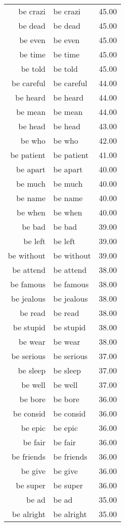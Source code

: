 \begin{table}[ht]
\begin{tabular}{rlr}
  be crazi & be crazi & 45.00 \\ 
  be dead & be dead & 45.00 \\ 
  be even & be even & 45.00 \\ 
  be time & be time & 45.00 \\ 
  be told & be told & 45.00 \\ 
  be careful & be careful & 44.00 \\ 
  be heard & be heard & 44.00 \\ 
  be mean & be mean & 44.00 \\ 
  be head & be head & 43.00 \\ 
  be who & be who & 42.00 \\ 
  be patient & be patient & 41.00 \\ 
  be apart & be apart & 40.00 \\ 
  be much & be much & 40.00 \\ 
  be name & be name & 40.00 \\ 
  be when & be when & 40.00 \\ 
  be bad & be bad & 39.00 \\ 
  be left & be left & 39.00 \\ 
  be without & be without & 39.00 \\ 
  be attend & be attend & 38.00 \\ 
  be famous & be famous & 38.00 \\ 
  be jealous & be jealous & 38.00 \\ 
  be read & be read & 38.00 \\ 
  be stupid & be stupid & 38.00 \\ 
  be wear & be wear & 38.00 \\ 
  be serious & be serious & 37.00 \\ 
  be sleep & be sleep & 37.00 \\ 
  be well & be well & 37.00 \\ 
  be bore & be bore & 36.00 \\ 
  be consid & be consid & 36.00 \\ 
  be epic & be epic & 36.00 \\ 
  be fair & be fair & 36.00 \\ 
  be friends & be friends & 36.00 \\ 
  be give & be give & 36.00 \\ 
  be super & be super & 36.00 \\ 
  be ad & be ad & 35.00 \\ 
  be alright & be alright & 35.00 \\ 

\end{tabular}
\end{table}
